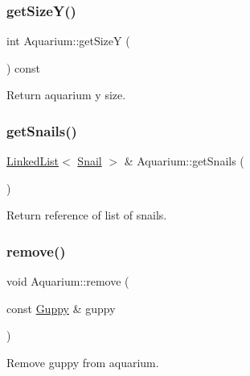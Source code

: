 \subsubsection{\texorpdfstring{get\+Size\+Y()}{getSizeY()}}
{\footnotesize\ttfamily int Aquarium\+::get\+SizeY (\begin{DoxyParamCaption}{ }\end{DoxyParamCaption}) const}



Return aquarium y size. 

\mbox{\label{class_aquarium_adae17992a9b26d6918b96159a929d3eb}} 
\subsubsection{\texorpdfstring{get\+Snails()}{getSnails()}}
{\footnotesize\ttfamily \mbox{\hyperlink{class_linked_list}{Linked\+List}}$<$ \mbox{\hyperlink{class_snail}{Snail}} $>$ \& Aquarium\+::get\+Snails (\begin{DoxyParamCaption}{ }\end{DoxyParamCaption})}



Return reference of list of snails. 

\mbox{\label{class_aquarium_a5db51e8b6e5401fcc4140c0c26c049ef}} 
\subsubsection{\texorpdfstring{remove()}{remove()}\hspace{0.1cm}{\footnotesize\ttfamily [1/5]}}
{\footnotesize\ttfamily void Aquarium\+::remove (\begin{DoxyParamCaption}\item[{const \mbox{\hyperlink{class_guppy}{Guppy}} \&}]{guppy }\end{DoxyParamCaption})}



Remove guppy from aquarium. 

\mbox{\label{class_aquarium_a816328c7f4740a9747735d0bf0d17996}} 
